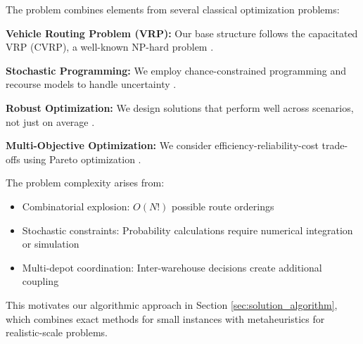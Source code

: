 The problem combines elements from several classical optimization problems:

\textbf{Vehicle Routing Problem (VRP):} Our base structure follows the capacitated VRP (CVRP), a well-known NP-hard problem \cite{Toth2014}.

\textbf{Stochastic Programming:} We employ chance-constrained programming and recourse models to handle uncertainty \cite{Birge2011}.

\textbf{Robust Optimization:} We design solutions that perform well across scenarios, not just on average \cite{Bertsimas2004}.

\textbf{Multi-Objective Optimization:} We consider efficiency-reliability-cost trade-offs using Pareto optimization \cite{Deb2002}.

The problem complexity arises from:
\begin{itemize}
\item Combinatorial explosion: $O(N!)$ possible route orderings
\item Stochastic constraints: Probability calculations require numerical integration or simulation
\item Multi-depot coordination: Inter-warehouse decisions create additional coupling
\end{itemize}

This motivates our algorithmic approach in Section \ref{sec:solution_algorithm}, which combines exact methods for small instances with metaheuristics for realistic-scale problems.
